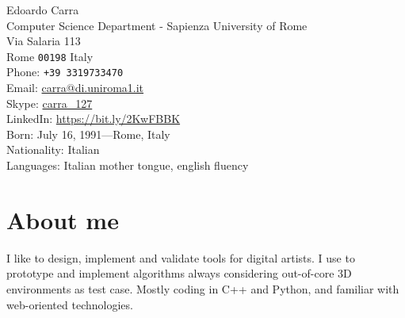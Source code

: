 \documentclass[11pt, a4paper]{article} %
\begin{document}


{\LARGE Edoardo Carra}\\[1cm] %

Computer Science Department - Sapienza University of Rome\\ %
Via Salaria 113\\
Rome \texttt{00198}
Italy\\[.2cm]
Phone: \texttt{+39 3319733470}\\ %
Email: \href{mailto:carra@di.uniroma1.it}{carra@di.uniroma1.it}\\ %
Skype: \href{https://join.skype.com/invite/gQN9qtZGLZ7r}{carra\_127}\\
LinkedIn: \href{https://www.linkedin.com/in/edoardocarra/}{https://bit.ly/2KwFBBK}\\ %


Born: July 16, 1991---Rome, Italy\\ %
Nationality: Italian\\ %
Languages: Italian mother tongue, english fluency\\

\section*{About me}

I like to design, implement and validate tools for digital artists. I use to prototype and implement algorithms always considering out-of-core 3D environments as test case. Mostly coding in C++ and Python, and familiar with web-oriented technologies.

\end{document}

